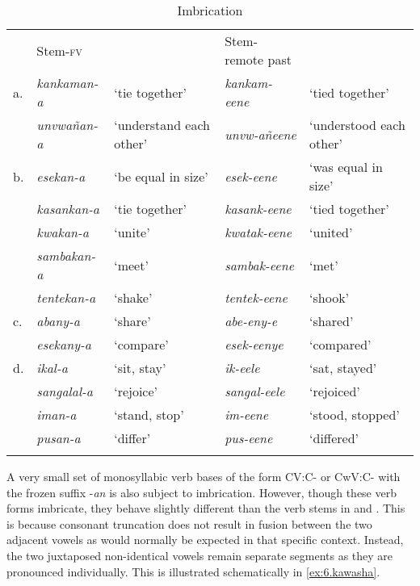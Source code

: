 \documentclass[output=paper]{langsci/langscibook}
\begin{document}
\begin{table}
\begin{tabular}{lllll}
\lsptoprule
 & Stem-\textsc{fv} &  & Stem-remote past & \\
a. & \textit{kankaman-a} & `tie together' & \textit{kankam-eene} & `tied together' \\
 & \textit{unvwañan-a} & `understand each other' & \textit{unvw-añeene} & `understood each other' \\

b. & \textit{esekan-a} & `be equal in size' & \textit{esek-eene} & `was equal in size' \\
 & \textit{kasankan-a} & `tie together' & \textit{kasank-eene} & `tied together' \\
 & \textit{kwakan-a} & `unite' & \textit{kwatak-eene} & `united' \\
 & \textit{sambakan-a} & `meet' & \textit{sambak-eene} & `met' \\
 & \textit{tentekan-a} & `shake' & \textit{tentek-eene} & `shook' \\

c. & \textit{abany-a} & `share' & \textit{abe-eny-e} & `shared' \\
 & \textit{esekany-a} & `compare' & \textit{esek-eenye} & `compared' \\

d. & \textit{ikal-a} & `sit, stay' & \textit{ik-eele} & `sat, stayed' \\
 & \textit{sangalal-a} & `rejoice' & \textit{sangal-eele} & `rejoiced' \\
 & \textit{iman-a} & `stand, stop' & \textit{im-eene} & `stood, stopped' \\
 & \textit{pusan-a} & `differ' & \textit{pus-eene} & `differed' \\

\lspbottomrule
\end{tabular}

\caption{Imbrication}
\label{tab:20.kawasha}

\end{table}


A very small set of monosyllabic verb bases of the form CV:C- or CwV:C- with the frozen suffix -\textit{an} is also subject to imbrication. However, though these verb forms imbricate, they behave slightly different than the verb stems in  and . This is because consonant truncation does not result in fusion between the two adjacent vowels as would normally be expected in that specific context. Instead, the two juxtaposed non-identical vowels remain separate segments as they are pronounced individually. This is illustrated schematically in \ref{ex:6.kawasha}. 
\end{document}
